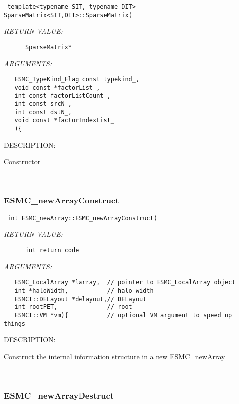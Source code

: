   
\begin{verbatim} 
 template<typename SIT, typename DIT> SparseMatrix<SIT,DIT>::SparseMatrix(\end{verbatim}{\em RETURN VALUE:}
\begin{verbatim}      SparseMatrix*\end{verbatim}{\em ARGUMENTS:}
\begin{verbatim}   ESMC_TypeKind_Flag const typekind_,
   void const *factorList_,
   int const factorListCount_,
   int const srcN_,
   int const dstN_,
   void const *factorIndexList_
   ){\end{verbatim}
{\sf DESCRIPTION:\\ }


      Constructor
   
 
\mbox{}\hrulefill\
 
\subsubsection [ESMC\_newArrayConstruct] {ESMC\_newArrayConstruct}


  
\begin{verbatim} int ESMC_newArray::ESMC_newArrayConstruct(\end{verbatim}{\em RETURN VALUE:}
\begin{verbatim}      int return code\end{verbatim}{\em ARGUMENTS:}
\begin{verbatim}   ESMC_LocalArray *larray,  // pointer to ESMC_LocalArray object
   int *haloWidth,           // halo width
   ESMCI::DELayout *delayout,// DELayout
   int rootPET,              // root
   ESMCI::VM *vm){           // optional VM argument to speed up things\end{verbatim}
{\sf DESCRIPTION:\\ }


      Construct the internal information structure in a new ESMC\_newArray
   
 
\mbox{}\hrulefill\
 
\subsubsection [ESMC\_newArrayDestruct] {ESMC\_newArrayDestruct}


